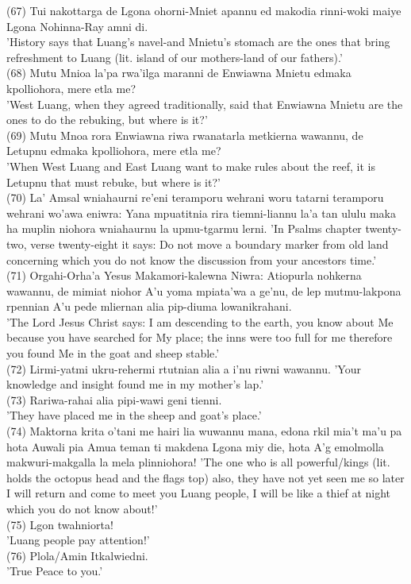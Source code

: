 \documentclass[10pt]{article}
\begin{document}
(67) Tui nakottarga de Lgona ohorni-Mniet apannu ed makodia rinni-woki maiye Lgona Nohinna-Ray amni di.\\
'History says that Luang's navel-and Mnietu's stomach are the ones that bring refreshment to Luang (lit. island of our mothers-land of our fathers).'\\
(68) Mutu Mnioa la'pa rwa'ilga maranni de Enwiawna Mnietu edmaka kpolliohora, mere etla me?\\
'West Luang, when they agreed traditionally, said that Enwiawna Mnietu are the ones to do the rebuking, but where is it?'\\
(69) Mutu Mnoa rora Enwiawna riwa rwanatarla metkierna wawannu, de Letupnu edmaka kpolliohora, mere etla me?\\
'When West Luang and East Luang want to make rules about the reef, it is Letupnu that must rebuke, but where is it?'\\
(70) La' Amsal wniahaurni re'eni teramporu wehrani woru tatarni teramporu wehrani wo'awa eniwra: Yana mpuatitnia rira tiemni-liannu la'a tan ululu maka ha muplin niohora wniahaurnu la upmu-tgarmu lerni. 'In Psalms chapter twenty-two, verse twenty-eight it says: Do not move a boundary marker from old land concerning which you do not know the discussion from your ancestors time.'\\
(71) Orgahi-Orha'a Yesus Makamori-kalewna Niwra: Atiopurla nohkerna wawannu, de mimiat niohor A'u yoma mpiata'wa a ge'nu, de lep mutmu-lakpona rpennian A'u pede mliernan alia pip-diuma lowanikrahani.\\
'The Lord Jesus Christ says: I am descending to the earth, you know about Me because you have searched for My place; the inns were too full for me therefore you found Me in the goat and sheep stable.'\\
(72) Lirmi-yatmi ukru-rehermi rtutnian alia a i'nu riwni wawannu. 'Your knowledge and insight found me in my mother's lap.'\\
(73) Rariwa-rahai alia pipi-wawi geni tienni.\\
'They have placed me in the sheep and goat's place.'\\
(74) Maktorna krita o'tani me hairi lia wuwannu mana, edona rkil mia't ma'u pa hota Auwali pia Amua teman ti makdena Lgona miy die, hota A'g emolmolla makwuri-makgalla la mela plinniohora! 'The one who is all powerful/kings (lit. holds the octopus head and the flags top) also, they have not yet seen me so later I will return and come to meet you Luang people, I will be like a thief at night which you do not know about!'\\
(75) Lgon twahniorta!\\
'Luang people pay attention!'\\
(76) Plola/Amin Itkalwiedni.\\
'True Peace to you.'
\end{document}

